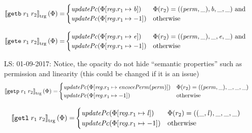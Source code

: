 \documentclass[a4paper]{article}
\newcommand\lau[1]{{\color{purple} \sf \footnotesize {LS: #1}}\\}
\newcommand{\sem}[1]{\left\llbracket #1 \right\rrbracket}
\newcommand{\tsem}[2][\Phi]{\sem{#2}_{\mathrm{trg}}(#1)}
\newcommand{\tand}{\text{ and }}
\newcommand{\totherwise}{\text{otherwise }}
\newcommand{\targetcolor}[1]{\color{black}}
\newcommand{\trg}[1]{{\targetcolor{} #1}}
\newcommand{\zinstr}[1]{\texttt{#1}}
\newcommand{\twoinstr}[3]{
  \ifthenelse{\equal{#2#3}{}}
  {\zinstr{#1}}
  {\zinstr{#1} \; #2 \; #3}
}
\newcommand{\tgetb}[2]{\twoinstr{\trg{getb}}{#1}{#2}}
\newcommand{\tgete}[2]{\twoinstr{\trg{gete}}{#1}{#2}}
\newcommand{\tgetp}[2]{\twoinstr{\trg{getp}}{#1}{#2}}
\newcommand{\tgetlin}[2]{\twoinstr{\trg{getl}}{#1}{#2}}
\newcommand{\update}[2]{[#1 \mapsto #2]}
\newcommand{\updReg}[2]{\update{\reg.#1}{#2}}
\newcommand{\perm}{\var{perm}}
\newcommand{\lin}{\var{l}}
\newcommand{\var}[1]{\mathit{#1}}
\newcommand{\reg}{\var{reg}}
\newcommand{\baddr}{\var{b}}
\newcommand{\eaddr}{\var{e}}
\newcommand{\plainfun}[2]{
  \ifthenelse{\equal{#2}{}}
  {\mathit{#1}}
  {\mathit{#1}(#2)}
}
\newcommand{\encPerm}[1]{\plainfun{encocePerm}{#1}}
\newcommand{\updPcAddr}[1]{\plainfun{updatePc}{#1}}
\begin{document}
\begin{align*}
  \tsem{\tgetb{r_1}{r_2}} = &
                              \begin{cases}
                                \updPcAddr{\Phi\update{\reg.r_1}{\baddr}} & 
                                \arraycolsep=0pt
                                \begin{array}[t]{l}
                                  \Phi(r_2) = ((\perm,\_),\baddr,\_,\_) \tand \\
                                \end{array} \\
                                \updPcAddr{\Phi\updReg{r_1}{-1}} & \totherwise
                              \end{cases}
\end{align*}

\begin{align*}
  \tsem{\tgete{r_1}{r_2}} = &
                              \begin{cases}
                                \updPcAddr{\Phi\update{\reg.r_1}{\eaddr}} & 
                                \arraycolsep=0pt
                                \begin{array}[t]{l}
                                  \Phi(r_2) = ((\perm,\_),\_,\eaddr,\_) \tand \\
                                \end{array} \\
                                \updPcAddr{\Phi\updReg{r_1}{-1}} & \totherwise
                              \end{cases}
\end{align*}

\lau{01-09-2017: Notice, the opacity do not hide ``semantic properties'' such as permission and linearity (this could be changed if it is an issue)}

\begin{align*}
  \tsem{\tgetp{r_1}{r_2}} = & 
                              \begin{cases}
                                \updPcAddr{}(\Phi\update{\reg.r_1}{\encPerm{\perm}}) & \Phi(r_2) = ((\perm,\_),\_,\_,\_)\\
                                \updPcAddr{\Phi\updReg{r_1}{-1}} & \totherwise
                              \end{cases}
\end{align*}

\begin{align*}
  \tsem{\tgetlin{r_1}{r_2}} = &                              
                              \begin{cases}
                                \updPcAddr{}(\Phi\update{\reg.r_1}{\lin}) & \Phi(r_2) = ((\_,\lin),\_,\_,\_) \\
                                \updPcAddr{\Phi\updReg{r_1}{-1}} & \totherwise
                              \end{cases}
\end{align*}
\end{document}
